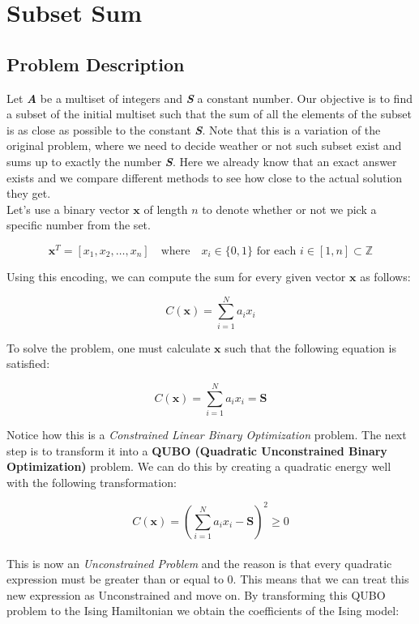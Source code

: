 \documentclass[12pt,a4paper]{report}
\begin{document}
\newpage

\section{Subset Sum}

\subsection{Problem Description}

Let \textbf{\textit{A}} be a multiset of integers and \textbf{\textit{S}} a constant number. Our objective is to find a subset of the initial multiset such that the sum of all the elements of the subset is as close as possible to the constant \textbf{\textit{S}}. Note that this is a variation of the original problem, where we need to decide weather or not such subset exist and sums up to exactly the number \textbf{\textit{S}}. Here we already know that an exact answer exists and we compare different methods to see how close to the actual solution they get.
\\

\noindent
Let's use a binary vector \( \mathbf{x} \) of length \( n \) to denote whether or not we pick a specific number from the set.

\[
\mathbf{x}^T = [x_1, x_2, \dots, x_n] \quad \text{where} \quad x_i \in \{0, 1\} \text{ for each } i \in [1, n] \subset \mathbb{Z}
\]

\noindent
Using this encoding, we can compute the sum for every given vector \( \mathbf{x} \) as follows:

\[
C(\mathbf{x}) = \sum_{i=1}^{N} a_i x_i
\]

\noindent
To solve the problem, one must calculate \( \mathbf{x} \) such that the following equation is satisfied:

\[
C(\mathbf{x}) = \sum_{i=1}^{N} a_i x_i = \mathbf{S}
\]

\noindent
Notice how this is a \textit{Constrained Linear Binary Optimization} problem. The next step is to transform it into a \textbf{QUBO (Quadratic Unconstrained Binary Optimization)} problem. We can do this by creating a quadratic energy well with the following transformation:

\[
C(\mathbf{x}) = \left( \sum_{i=1}^{N} a_i x_i - \mathbf{S} \right)^2 \geq 0
\]
\\

\noindent
This is now an \textit{Unconstrained Problem} and the reason is that every quadratic expression must be greater than or equal to 0. This means that we can treat this new expression as Unconstrained and move on. By transforming this QUBO problem to the Ising Hamiltonian we obtain the coefficients of the Ising model:
\\
\end{document}

